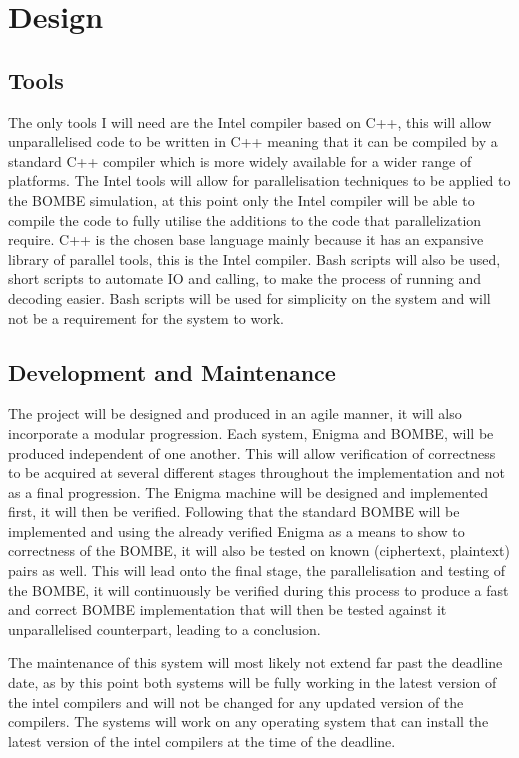 \documentclass[12pt,a4paper]{article}
\begin{document}
\section{Design}

\subsection{Tools}

The only tools I will need are the Intel compiler based on C++, this will allow unparallelised code to be written in C++ meaning that it can be compiled by a standard C++ compiler which is more widely available for a wider range of platforms. The Intel tools will allow for parallelisation techniques to be applied to the BOMBE simulation, at this point only the Intel compiler will be able to compile the code to fully utilise the additions to the code that parallelization require. C++ is the chosen base language mainly because it has an expansive library of parallel tools, this is the Intel compiler. Bash scripts will also be used, short scripts to automate IO and calling, to make the process of running and decoding easier. Bash scripts will be used for simplicity on the system and will not be a requirement for the system to work.

\subsection{Development and Maintenance}

The project will be designed and produced in an agile manner, it will also incorporate a modular progression. Each system, Enigma and BOMBE, will be produced independent of one another. This will allow verification of correctness to be acquired at several different stages throughout the implementation and not as a final progression. The Enigma machine will be designed and implemented first, it will then be verified. Following that the standard BOMBE will be implemented and using the already verified Enigma as a means to show to correctness of the BOMBE, it will also be tested on known (ciphertext, plaintext) pairs as well. This will lead onto the final stage, the parallelisation and testing of the BOMBE, it will continuously be verified during this process to produce a fast and correct BOMBE implementation that will then be tested against it unparallelised counterpart, leading to a conclusion.

The maintenance of this system will most likely not extend far past the deadline date, as by this point both systems will be fully working in the latest version of the intel compilers and will not be changed for any updated version of the compilers. The systems will work on any operating system that can install the latest version of the intel compilers at the time of the deadline.
\end{document}
